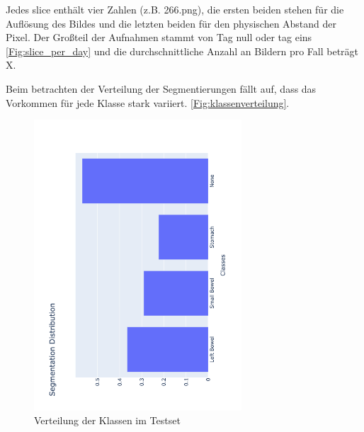 Jedes slice enthält vier Zahlen (z.B. 266.png), die ersten beiden stehen für die Auflösung des Bildes und die letzten beiden für den physischen Abstand der Pixel. Der Großteil der Aufnahmen stammt von Tag null oder tag eins \autoref{Fig:slice_per_day} und die durchschnittliche Anzahl an Bildern pro Fall beträgt X.

Beim betrachten der Verteilung der Segmentierungen fällt auf, dass das Vorkommen für jede Klasse stark variiert. \autoref{Fig:klassenverteilung}.

\begin{figure}[htb]
	\begin{center}
		\includegraphics[width=220pt , angle=270]{bilder/segmentation_distribution}
		\caption{Verteilung der Klassen im Testset}\label{Fig:klassenverteilung}
	\end{center}
\end{figure}

